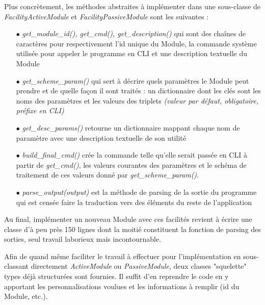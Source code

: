 \documentclass[]{article}
\begin{document}
Plus concrètement, les méthodes abstraites à implémenter dans une sous-classe de \textit{FacilityActiveModule} et \textit{FacilityPassiveModule} sont les suivantes :\\
\begin{itemize}
\item[$\bullet$] \textit{get\_module\_id(), get\_cmd(), get\_description()} qui sont des chaînes de caractères pour respectivement l'id unique du Module, la commande système utilisée pour appeler le programme en CLI et une description textuelle du Module
\vspace{0.2cm}
\item[$\bullet$] \textit{get\_scheme\_param()} qui sert à décrire quels paramètres le Module peut prendre et de quelle façon il sont traités : un dictionnaire dont les clés sont les noms des paramètres et les valeurs des triplets \textit{(valeur par défaut, obligatoire, préfixe en CLI)}
\vspace{0.2cm}
\item[$\bullet$] \textit{get\_desc\_params()} retourne un dictionnaire mappant chaque nom de paramètre avec une description textuelle de son utilité
\vspace{0.2cm}
\item[$\bullet$] \textit{build\_final\_cmd()} crée la commande telle qu'elle serait passée en CLI à partir de \textit{get\_cmd()}, les valeurs courantes des paramètres et le schéma de traitement de ces valeurs donné par \textit{get\_scheme\_param()}.
\vspace{0.2cm}
\item[$\bullet$] \textit{parse\_output(output)} est la méthode de parsing de la sortie du programme qui est censée faire la traduction vers des éléments du reste de l'application
\vspace{0.2cm}
\end{itemize}

Au final, implémenter un nouveau Module avec ces facilités revient à écrire une classe d'à peu près 150 lignes dont la moitié constituent la fonction de parsing des sorties, seul travail laborieux mais incontournable.\\

\par Afin de quand même faciliter le travail à effectuer pour l'implémentation en sous-classant directement \textit{ActiveModule} ou \textit{PassiveModule}, deux classes "squelette" types déjà structurées sont fournies. Il suffit d'en reprendre le code en y apportant les personnalisations voulues et les informations à remplir (id du Module, etc.).\\
\end{document}
